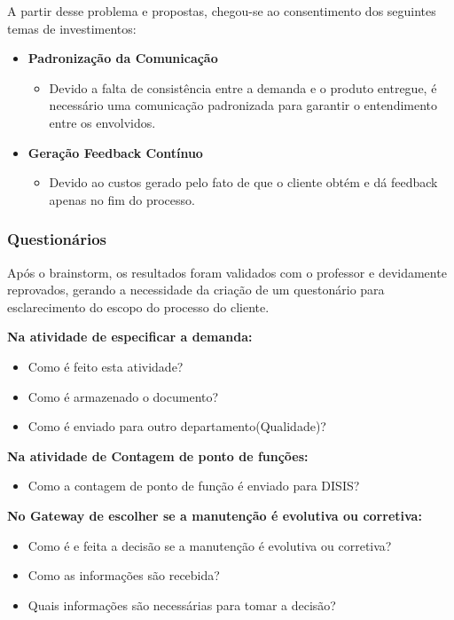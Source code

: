 A partir desse problema e propostas, chegou-se ao consentimento dos seguintes temas de investimentos:

\begin{itemize}
	\item \textbf{Padronização da Comunicação}
		\begin{itemize}
			\item Devido a falta de consistência entre a demanda e o produto entregue, é necessário uma comunicação padronizada para garantir o entendimento entre os envolvidos.
		\end{itemize}
	\item \textbf{Geração Feedback Contínuo}
		\begin{itemize}
			\item Devido ao custos gerado pelo fato de que o cliente obtém e dá feedback apenas no fim do processo.
		\end{itemize}
\end{itemize}


\subsubsection{Questionários}

Após o brainstorm, os resultados foram validados com o professor e devidamente reprovados, gerando a necessidade da criação de um questonário para esclarecimento do escopo do processo do cliente.

\textbf{Na atividade de especificar a demanda:}
\begin{itemize}
	\item Como é feito esta atividade? 
	\item Como é armazenado o documento? 
	\item Como é enviado para outro departamento(Qualidade)?
\end{itemize}

\textbf{Na atividade de Contagem de ponto de funções:}
\begin{itemize}
	\item Como a contagem de ponto de função é enviado para DISIS?
\end{itemize}

\textbf{No Gateway de escolher se a manutenção é evolutiva ou corretiva:}
\begin{itemize}
	\item Como é e feita a decisão se a manutenção é evolutiva ou corretiva? 
	\item Como as informações são recebida? 
	\item Quais informações são necessárias para tomar a decisão?
\end{itemize}

